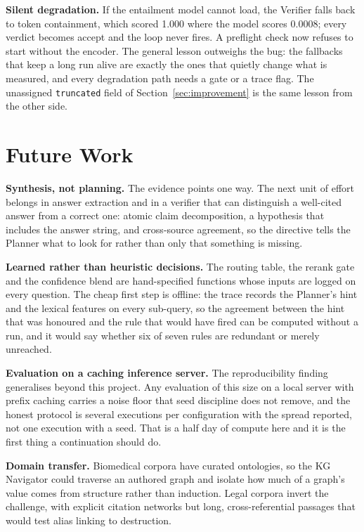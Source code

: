\textbf{Silent degradation.} If the entailment model cannot load, the Verifier
falls back to token containment, which scored 1.000 where the model scores
0.0008; every verdict becomes accept and the loop never fires. A preflight
check now refuses to start without the encoder. The general lesson outweighs
the bug: the fallbacks that keep a long run alive are exactly the ones that
quietly change what is measured, and every degradation path needs a gate or a
trace flag. The unassigned \texttt{truncated} field of
Section~\ref{sec:improvement} is the same lesson from the other side.

\section{Future Work}

\textbf{Synthesis, not planning.} The evidence points one way. The next unit
of effort belongs in answer extraction and in a verifier that can distinguish a
well-cited answer from a correct one: atomic claim decomposition, a hypothesis
that includes the answer string, and cross-source agreement, so the directive
tells the Planner what to look for rather than only that something is missing.

\textbf{Learned rather than heuristic decisions.} The routing table, the
rerank gate and the confidence blend are hand-specified functions whose inputs
are logged on every question. The cheap first step is offline: the trace
records the Planner's hint and the lexical features on every sub-query, so the
agreement between the hint that was honoured and the rule that would have fired
can be computed without a run, and it would say whether six of seven rules are
redundant or merely unreached.

\textbf{Evaluation on a caching inference server.} The reproducibility finding
generalises beyond this project. Any evaluation of this size on a local server
with prefix caching carries a noise floor that seed discipline does not remove,
and the honest protocol is several executions per configuration with the
spread reported, not one execution with a seed. That is a half day of compute
here and it is the first thing a continuation should do.

\textbf{Domain transfer.} Biomedical corpora have curated ontologies, so the
KG Navigator could traverse an authored graph and isolate how much of a graph's
value comes from structure rather than induction. Legal corpora invert the
challenge, with explicit citation networks but long, cross-referential
passages that would test alias linking to destruction.

